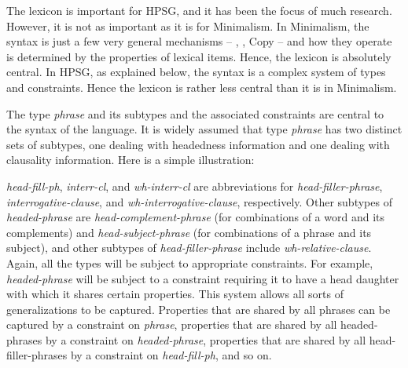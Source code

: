 \documentclass[output=paper]{langsci/langscibook}
\begin{document}
The lexicon is important for \gls{HPSG}, and it has been the focus of much
research. However, it is not as important as it is for Minimalism. In
Minimalism, the syntax is just a few very general mechanisms -- , ,
Copy -- and how they operate is determined by the properties of lexical items.
Hence, the lexicon is absolutely central. In \gls{HPSG}, as explained below,
the syntax is a complex system of types and constraints. Hence the lexicon is
rather less central than it is in Minimalism.

The type \emph{phrase} and its subtypes and the associated constraints are
central to the syntax of the language. It is widely assumed that type
\emph{phrase} has two distinct sets of subtypes, one dealing with headedness
information and one dealing with clausality information. Here is a simple
illustration:

\ea\label{ex:key:4.5}
\z
%
\emph{head-fill-ph}, \emph{interr-cl}, and \emph{wh-interr-cl} are
abbreviations for \emph{head-filler-phrase}, \emph{interrogative-clause}, and
\emph{wh-interrogative-clause}, respectively. Other subtypes of
\emph{headed-phrase}  are \emph{head-complement-phrase} (for combinations of a
word and its complements) and \emph{head-subject-phrase} (for combinations of a
phrase and its subject), and other subtypes of \emph{head-filler-phrase}
include \emph{wh-relative-clause}. Again, all the types will be subject to
appropriate constraints. For example, \emph{headed-phrase} will be subject to a
constraint requiring it to have a head daughter with which it shares certain
properties. This system allows all sorts of generalizations to be captured.
Properties that are shared by all phrases can be captured by a constraint on
\emph{phrase}, properties that are shared by all headed-phrases by a constraint
on \emph{headed-phrase}, properties that are shared by all head-filler-phrases
by a constraint on \emph{head-fill-ph}, and so on.
\end{document}
